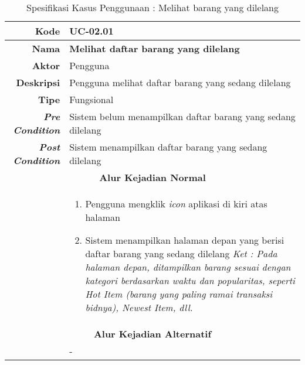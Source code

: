 
\begin{table}[H]
	\centering
	\begin{tabular}{|r|p{8cm}|}
		\hline
		\textbf{Kode}                                                    & UC-02.01                                                     \\ \hline
		\textbf{Nama}                                                    
			& \textbf{Melihat daftar barang yang dilelang}                                         
			\\ \hline
		\textbf{Aktor}                                                   & Pengguna                                                    \\ \hline
		\textbf{Deskripsi}
			& Pengguna melihat daftar barang yang sedang dilelang
			\\ \hline
		\textbf{Tipe}                                                    
			& Fungsional
			\\ \hline
		\textbf{\textit{Pre Condition}}
			& Sistem belum menampilkan daftar barang yang sedang dilelang
			\\ \hline
		\textbf{\textit{Post Condition}}
			& Sistem menampilkan daftar barang yang sedang dilelang
			\\ \hline
		\multicolumn{2}{|c|}{\textbf{Alur Kejadian Normal}}                                                                            \\ \hline
		\multicolumn{1}{|l|}{}                                           & 
		\begin{enumerate}
			\item Pengguna mengklik \textit{icon} aplikasi di kiri atas halaman
			\item Sistem menampilkan halaman depan yang berisi daftar barang yang sedang dilelang
				  \newline
				  \textit{Ket : Pada halaman depan, ditampilkan barang sesuai dengan kategori berdasarkan waktu dan popularitas, seperti Hot Item (barang yang paling ramai transaksi bidnya), Newest Item, dll.}
		\end{enumerate}
		\\ \hline
		\multicolumn{2}{|c|}{\textbf{Alur Kejadian Alternatif}}                                                         \\ \hline
		\multicolumn{1}{|l|}{}                                           
			& -
		\\ \hline
	\end{tabular}
	\caption{Spesifikasi Kasus Penggunaan : Melihat barang yang dilelang}
	\label{uc02.01}
\end{table}